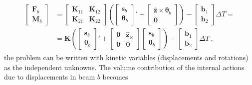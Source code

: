 \documentclass[letterpaper,10pt,english]{jupyterBook}
\begin{document}
\begin{equation*}
\begin{split}\begin{aligned}
  \begin{bmatrix} \mathbf{F}_b \\ \mathbf{M}_b \end{bmatrix}
  & = \begin{bmatrix} \mathbf{K}_{11} & \mathbf{K}_{12} \\ \mathbf{K}_{21} & \mathbf{K}_{22} \end{bmatrix} \left( \begin{bmatrix} \mathbf{s}_b \\ \boldsymbol\theta_b \end{bmatrix}' + \begin{bmatrix} \hat{\mathbf{z}} \times \boldsymbol{\theta}_b \\ \mathbf{0} \end{bmatrix} \right) - \begin{bmatrix} \mathbf{b}_1 \\ \mathbf{b}_2 \end{bmatrix} \Delta T = \\
  & = \mathbf{K} \left( \begin{bmatrix} \mathbf{s}_b \\ \boldsymbol\theta_b \end{bmatrix}' + \begin{bmatrix} \mathbf{0} & \hat{\mathbf{z}}_\times \\ \mathbf{0} & \mathbf{0} \end{bmatrix} \begin{bmatrix} \mathbf{s}_b \\ \boldsymbol{\theta}_b \end{bmatrix} \right) - \begin{bmatrix} \mathbf{b}_1 \\ \mathbf{b}_2 \end{bmatrix} \Delta T \ ,
\end{aligned}\end{split}
\end{equation*}
\sphinxAtStartPar
the problem can be written with kinetic variables (displacements and rotations) as the independent unknowns. The volume contribution of the internal actions due to displacements in beam \(b\) becomes
\end{document}
